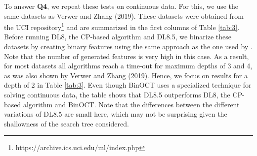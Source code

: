 To answer \textbf{Q4}, we repeat these tests on continuous data. For this, we use the same datasets as Verwer and Zhang (2019). These datasets were obtained from the UCI repository\footnote{https://archive.ics.uci.edu/ml/index.php} and are summarized in the first columns of Table \ref{tab:3}. Before running DL8, the CP-based algorithm and DL8.5, we binarize these datasets by creating binary features using the same approach as the one used by \cite{verwer:2019learning}. %
Note that the number of generated features is very high in this case. As a result, for most datasets all algorithms reach a time-out for maximum depths of 3 and 4, as was also shown by Verwer and Zhang (2019). Hence, we focus on results for a depth of 2 in Table \ref{tab:3}. Even though BinOCT uses a specialized technique for solving continuous data, the table shows that DL8.5 outperforms DL8, the CP-based algorithm and BinOCT. Note that the differences between the different variations of DL8.5 are small here, which may not be surprising given the shallowness of the search tree considered.

